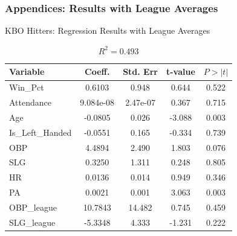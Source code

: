\documentclass[9pt]{beamer}
\begin{document}
\begin{frame}
    \frametitle{Appendices: Results with League Averages} 
    \begin{block}{KBO Hitters: Regression Results with League Averages}
        \begin{table}[ht]
            \centering
            \caption{$R^2 = 0.493$}
            \begin{tabular}{lcccc}
            \toprule
            Variable & Coeff. & Std. Err & t-value & $P > |t|$ \\
            \midrule
            Win\_Pct & 0.6103 & 0.948 & 0.644 & 0.522 \\
            Attendance & 9.084e-08 & 2.47e-07 & 0.367 & 0.715 \\
            \rowcolor{red!20} Age & -0.0805 & 0.026 & -3.088 & 0.003 \\
            Is\_Left\_Handed & -0.0551 & 0.165 & -0.334 & 0.739 \\
            \rowcolor{blue!20} OBP & 4.4894 & 2.490 & 1.803 & 0.076 \\
            SLG & 0.3250 & 1.311 & 0.248 & 0.805 \\
            HR & 0.0136 & 0.014 & 0.949 & 0.346 \\
            \rowcolor{red!20} PA & 0.0021 & 0.001 & 3.063 & 0.003 \\
            OBP\_league & 10.7843 & 14.482 & 0.745 & 0.459 \\
            SLG\_league & -5.3348 & 4.333 & -1.231 & 0.222 \\
            \bottomrule
            \end{tabular}
        \end{table}
        
    \end{block}
\end{frame}
\end{document}
